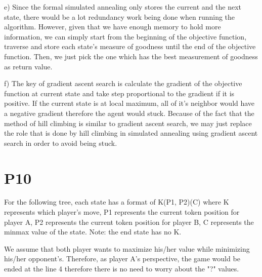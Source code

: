 \documentclass{article}
\begin{document}
e) Since the formal simulated annealing only stores the current and the next state, there would be a lot redundancy work being done when running the algorithm. However, given that we have enough memory to hold more information, we can simply start from the beginning of the objective function, traverse and store each state's measure of goodness until the end of the objective function. Then, we just pick the one which has the best measurement of goodness as return value.

f) The key of gradient ascent search is calculate the gradient of the objective function at current state and take step proportional to the gradient if it is positive. If the current state is at local maximum, all of it's neighbor would have a negative gradient therefore the agent would stuck. Because of the fact that the method of hill climbing is similar to gradient ascent search, we may just replace the role that is done by hill climbing in simulated annealing using gradient ascent search in order to avoid being stuck.

\section*{P10}

For the following tree, each state has a format of K(P1, P2)(C) where K represents which player's move, P1 represents the current token position for player A, P2 represents the current token position for player B, C represents the minmax value of the state. Note: the end state has no K.


\vspace{5mm}
\hspace{5mm}
We assume that both player wants to maximize his/her value while minimizing his/her opponent's. Therefore, as player A's perspective, the game would be ended at the line 4 therefore there is no need to worry about the "?" values.
\end{document}
